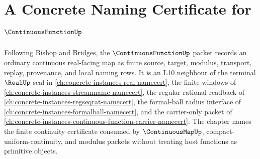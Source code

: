 \chapter{A Concrete Naming Certificate for $\ContinuousFunctionUp$}
\label{ch:concrete-instances-continuous-function-namecert}

Following Bishop and Bridges, the $\ContinuousFunctionUp$ packet records an ordinary continuous real-facing map as finite source, target, modulus, transport, replay, provenance, and local naming rows. It is an L10 neighbour of the terminal $\RealUp$ seal in \autoref{ch:concrete-instances-real-namecert}, the finite windows of \autoref{ch:concrete-instances-streamname-namecert}, the regular rational readback of \autoref{ch:concrete-instances-regseqrat-namecert}, the formal-ball radius interface of \autoref{ch:concrete-instances-formalball-namecert}, and the carrier-only packet of \autoref{ch:concrete-instances-continuous-function-carrier-namecert}. The chapter names the finite continuity certificate consumed by $\ContinuousMapUp$, compact-uniform-continuity, and modulus packets without treating host functions as primitive objects.

